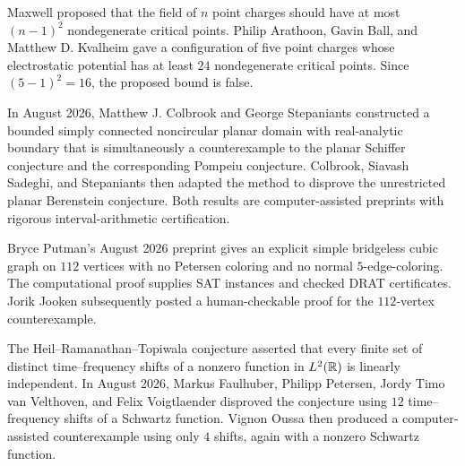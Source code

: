     \begin{fact}
        Maxwell proposed that the field of $n$ point charges should have at most
        $(n-1)^2$ nondegenerate critical points. Philip Arathoon, Gavin Ball, and
        Matthew D. Kvalheim gave a configuration of five point charges whose
        electrostatic potential has at least $24$ nondegenerate critical points.
        Since $(5-1)^2=16$, the proposed bound is false.
    \end{fact}

    \begin{fact}
        In August 2026, Matthew J. Colbrook and George Stepaniants constructed a
        bounded simply connected noncircular planar domain with real-analytic
        boundary that is simultaneously a counterexample to the planar Schiffer
        conjecture and the corresponding Pompeiu conjecture. Colbrook, Siavash
        Sadeghi, and Stepaniants then adapted the method to disprove the
        unrestricted planar Berenstein conjecture. Both results are
        computer-assisted preprints with rigorous interval-arithmetic
        certification.
    \end{fact}

    \begin{fact}
        Bryce Putman's August 2026 preprint gives an explicit simple bridgeless
        cubic graph on $112$ vertices with no Petersen coloring and no normal
        $5$-edge-coloring. The computational proof supplies SAT instances and
        checked DRAT certificates. Jorik Jooken subsequently posted a
        human-checkable proof for the $112$-vertex counterexample.
    \end{fact}

    \begin{fact}
        The Heil--Ramanathan--Topiwala conjecture asserted that every finite set
        of distinct time--frequency shifts of a nonzero function in
        $L^2(\mathbb{R})$ is linearly independent. In August 2026, Markus Faulhuber,
        Philipp Petersen, Jordy Timo van Velthoven, and Felix Voigtlaender
        disproved the conjecture using $12$ time--frequency shifts of a
        Schwartz function. Vignon Oussa then produced a computer-assisted
        counterexample using only $4$ shifts, again with a nonzero Schwartz
        function.
    \end{fact}

